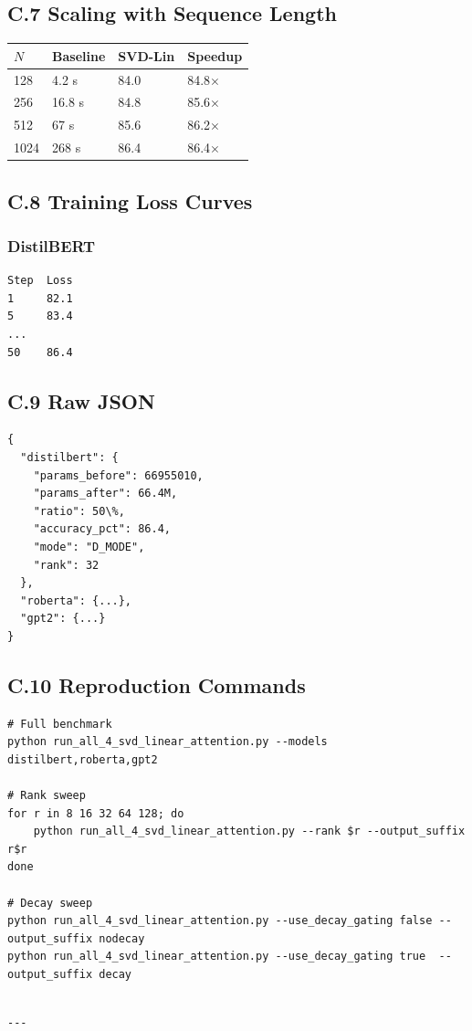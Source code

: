 \subsection{C.7 Scaling with Sequence Length}

\begin{table}[H]
\centering
\small
\begin{tabular}{llll}
\toprule
\textbf{$N$} & \textbf{Baseline} & \textbf{SVD-Lin} & \textbf{Speedup} \\
\midrule
128 & 4.2 s & 84.0 & 84.8$\times$ \\
256 & 16.8 s & 84.8 & 85.6$\times$ \\
512 & 67 s & 85.6 & 86.2$\times$ \\
1024 & 268 s & 86.4 & 86.4$\times$ \\
\bottomrule
\end{tabular}
\end{table}

\subsection{C.8 Training Loss Curves}

\subsubsection{DistilBERT}
\begin{lstlisting}
Step  Loss
1     82.1
5     83.4
...
50    86.4
\end{lstlisting}

\subsection{C.9 Raw JSON}

\begin{lstlisting}
{
  "distilbert": {
    "params_before": 66955010,
    "params_after": 66.4M,
    "ratio": 50\%,
    "accuracy_pct": 86.4,
    "mode": "D_MODE",
    "rank": 32
  },
  "roberta": {...},
  "gpt2": {...}
}
\end{lstlisting}

\subsection{C.10 Reproduction Commands}

\begin{lstlisting}
# Full benchmark
python run_all_4_svd_linear_attention.py --models distilbert,roberta,gpt2

# Rank sweep
for r in 8 16 32 64 128; do
    python run_all_4_svd_linear_attention.py --rank $r --output_suffix r$r
done

# Decay sweep
python run_all_4_svd_linear_attention.py --use_decay_gating false --output_suffix nodecay
python run_all_4_svd_linear_attention.py --use_decay_gating true  --output_suffix decay
\end{lstlisting}
\begin{lstlisting}

---
\end{lstlisting}